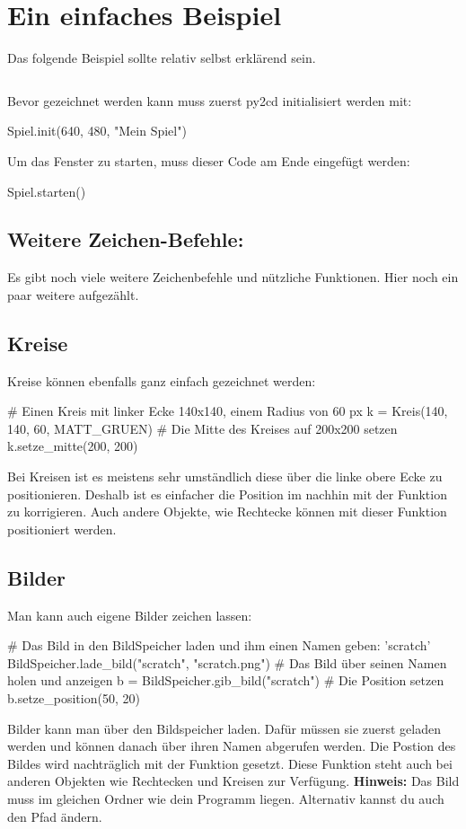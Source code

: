 \documentclass{\VorlagenPfad/coderdojokatext}
\begin{document}
\pagebreak
\section{Ein einfaches Beispiel}
Das folgende Beispiel sollte relativ selbst erklärend sein.
\inputminted[firstline=3]{python}{../../../Beispiele/py2cd/erste_schritte.py}

\begin{merkbox}
Bevor gezeichnet werden kann muss zuerst py2cd initialisiert werden mit:

\begin{pythoncode}
Spiel.init(640, 480, "Mein Spiel")
\end{pythoncode}

Um das Fenster zu starten, muss dieser Code am Ende eingefügt werden:

\begin{pythoncode}
Spiel.starten()
\end{pythoncode}
\end{merkbox}

\subsection{Weitere Zeichen-Befehle:}
Es gibt noch viele weitere Zeichenbefehle und nützliche Funktionen. Hier noch ein paar weitere aufgezählt.
\subsection{Kreise}
Kreise können ebenfalls ganz einfach gezeichnet werden:
\begin{pythoncode}
# Einen Kreis mit linker Ecke 140x140, einem Radius von 60 px
k = Kreis(140, 140, 60, MATT_GRUEN)
# Die Mitte des Kreises auf 200x200 setzen
k.setze_mitte(200, 200)
\end{pythoncode}

Bei Kreisen ist es meistens sehr umständlich diese über die linke obere Ecke zu positionieren. Deshalb ist es einfacher die Position im nachhin mit der Funktion  zu korrigieren. Auch andere Objekte, wie Rechtecke können mit dieser Funktion positioniert werden.

\subsection{Bilder}
Man kann auch eigene Bilder zeichen lassen:
\begin{pythoncode}
# Das Bild in den BildSpeicher laden und ihm einen Namen geben: 'scratch' 
BildSpeicher.lade_bild("scratch", "scratch.png")
# Das Bild über seinen Namen holen und anzeigen
b = BildSpeicher.gib_bild("scratch")
# Die Position setzen
b.setze_position(50, 20)
\end{pythoncode}
Bilder kann man über den Bildspeicher laden. Dafür müssen sie zuerst geladen werden und können danach über ihren Namen abgerufen werden. Die Postion des Bildes wird nachträglich mit der Funktion  gesetzt. Diese Funktion steht auch bei anderen Objekten wie Rechtecken und Kreisen zur Verfügung.
\textbf{Hinweis:} Das Bild muss im gleichen Ordner wie dein Programm liegen. Alternativ kannst du auch den Pfad  ändern.
\end{document}
